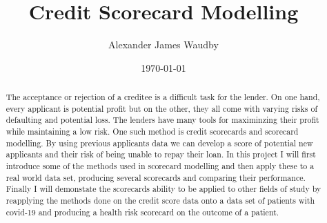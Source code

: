 

\author{Alexander James Waudby}
\title{Credit Scorecard Modelling}
\date{\today}



\maketitle

\begin{abstract}
The acceptance or rejection of a creditee is a difficult task for the lender. On one hand, every applicant is potential profit but on the other, they all come with varying risks of defaulting and potential loss. The lenders have many tools for maximinzing their profit while maintaining a low risk. One such method is credit scorecards and scorecard modelling. By using previous applicants data we can develop a score of potential new applicants and their risk of being unable to repay their loan. In this project I will first introduce some of the methods used in scorecard modelling and then apply these to a real world data set, producing several scorecards and comparing their performance. Finally I will demonstate the scorecards ability to be applied to other fields of study by reapplying the methods done on the credit score data onto a data set of patients with covid-19 and producing a health risk scorecard on the outcome of a patient.
\end{abstract}
\restoregeometry

\tableofcontents

\listoffigures















\printbibliography

